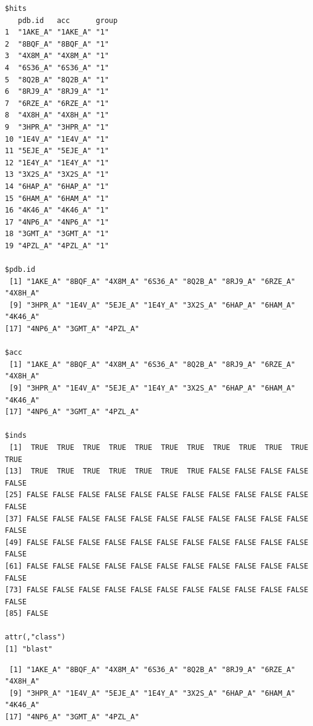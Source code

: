 \documentclass[
  letterpaper,
  DIV=11,
  numbers=noendperiod]{scrartcl}
\newenvironment{Shaded}{\begin{snugshade}}{\end{snugshade}}
\newcommand{\NormalTok}[1]{\textcolor[rgb]{0.00,0.23,0.31}{#1}}
\newcommand{\SpecialCharTok}[1]{\textcolor[rgb]{0.37,0.37,0.37}{#1}}
\begin{document}
\begin{verbatim}
$hits
   pdb.id   acc      group
1  "1AKE_A" "1AKE_A" "1"  
2  "8BQF_A" "8BQF_A" "1"  
3  "4X8M_A" "4X8M_A" "1"  
4  "6S36_A" "6S36_A" "1"  
5  "8Q2B_A" "8Q2B_A" "1"  
6  "8RJ9_A" "8RJ9_A" "1"  
7  "6RZE_A" "6RZE_A" "1"  
8  "4X8H_A" "4X8H_A" "1"  
9  "3HPR_A" "3HPR_A" "1"  
10 "1E4V_A" "1E4V_A" "1"  
11 "5EJE_A" "5EJE_A" "1"  
12 "1E4Y_A" "1E4Y_A" "1"  
13 "3X2S_A" "3X2S_A" "1"  
14 "6HAP_A" "6HAP_A" "1"  
15 "6HAM_A" "6HAM_A" "1"  
16 "4K46_A" "4K46_A" "1"  
17 "4NP6_A" "4NP6_A" "1"  
18 "3GMT_A" "3GMT_A" "1"  
19 "4PZL_A" "4PZL_A" "1"  

$pdb.id
 [1] "1AKE_A" "8BQF_A" "4X8M_A" "6S36_A" "8Q2B_A" "8RJ9_A" "6RZE_A" "4X8H_A"
 [9] "3HPR_A" "1E4V_A" "5EJE_A" "1E4Y_A" "3X2S_A" "6HAP_A" "6HAM_A" "4K46_A"
[17] "4NP6_A" "3GMT_A" "4PZL_A"

$acc
 [1] "1AKE_A" "8BQF_A" "4X8M_A" "6S36_A" "8Q2B_A" "8RJ9_A" "6RZE_A" "4X8H_A"
 [9] "3HPR_A" "1E4V_A" "5EJE_A" "1E4Y_A" "3X2S_A" "6HAP_A" "6HAM_A" "4K46_A"
[17] "4NP6_A" "3GMT_A" "4PZL_A"

$inds
 [1]  TRUE  TRUE  TRUE  TRUE  TRUE  TRUE  TRUE  TRUE  TRUE  TRUE  TRUE  TRUE
[13]  TRUE  TRUE  TRUE  TRUE  TRUE  TRUE  TRUE FALSE FALSE FALSE FALSE FALSE
[25] FALSE FALSE FALSE FALSE FALSE FALSE FALSE FALSE FALSE FALSE FALSE FALSE
[37] FALSE FALSE FALSE FALSE FALSE FALSE FALSE FALSE FALSE FALSE FALSE FALSE
[49] FALSE FALSE FALSE FALSE FALSE FALSE FALSE FALSE FALSE FALSE FALSE FALSE
[61] FALSE FALSE FALSE FALSE FALSE FALSE FALSE FALSE FALSE FALSE FALSE FALSE
[73] FALSE FALSE FALSE FALSE FALSE FALSE FALSE FALSE FALSE FALSE FALSE FALSE
[85] FALSE

attr(,"class")
[1] "blast"
\end{verbatim}

\begin{Shaded}
\end{Shaded}

\begin{verbatim}
 [1] "1AKE_A" "8BQF_A" "4X8M_A" "6S36_A" "8Q2B_A" "8RJ9_A" "6RZE_A" "4X8H_A"
 [9] "3HPR_A" "1E4V_A" "5EJE_A" "1E4Y_A" "3X2S_A" "6HAP_A" "6HAM_A" "4K46_A"
[17] "4NP6_A" "3GMT_A" "4PZL_A"
\end{verbatim}

\begin{Shaded}
\end{Shaded}
\end{document}
